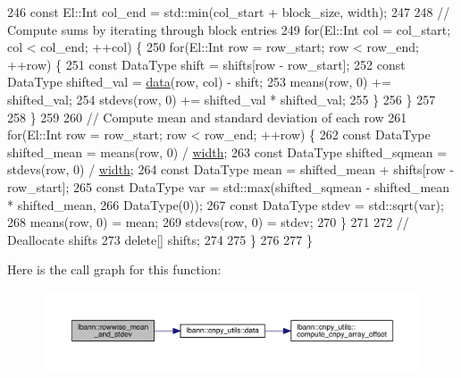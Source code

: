 \begin{DoxyCode}
246       \textcolor{keyword}{const} El::Int col\_end = std::min(col\_start + block\_size, width);
247 
248       \textcolor{comment}{// Compute sums by iterating through block entries}
249       \textcolor{keywordflow}{for}(El::Int col = col\_start; col < col\_end; ++col) \{
250         \textcolor{keywordflow}{for}(El::Int row = row\_start; row < row\_end; ++row) \{
251           \textcolor{keyword}{const} DataType shift = shifts[row - row\_start];
252           \textcolor{keyword}{const} DataType shifted\_val = \hyperlink{namespacelbann_1_1cnpy__utils_a9ac86d96ccb1f8b4b2ea16441738781f}{data}(row, col) - shift;
253           means(row, 0) += shifted\_val;
254           stdevs(row, 0) += shifted\_val * shifted\_val;
255         \}
256       \}
257 
258     \}
259 
260     \textcolor{comment}{// Compute mean and standard deviation of each row}
261     \textcolor{keywordflow}{for}(El::Int row = row\_start; row < row\_end; ++row) \{
262       \textcolor{keyword}{const} DataType shifted\_mean = means(row, 0) / \hyperlink{structlayer__header_af1f45c9c74db048ea424114418f22d50}{width};
263       \textcolor{keyword}{const} DataType shifted\_sqmean = stdevs(row, 0) / \hyperlink{structlayer__header_af1f45c9c74db048ea424114418f22d50}{width};
264       \textcolor{keyword}{const} DataType mean = shifted\_mean + shifts[row - row\_start];
265       \textcolor{keyword}{const} DataType var = std::max(shifted\_sqmean - shifted\_mean * shifted\_mean,
266                                     DataType(0));
267       \textcolor{keyword}{const} DataType stdev = std::sqrt(var);
268       means(row, 0) = mean;
269       stdevs(row, 0) = stdev;
270     \}
271 
272     \textcolor{comment}{// Deallocate shifts}
273     \textcolor{keyword}{delete}[] shifts;
274 
275   \}
276 
277 \}
\end{DoxyCode}
Here is the call graph for this function\+:\nopagebreak
\begin{figure}[H]
\begin{center}
\leavevmode
\includegraphics[width=350pt]{namespacelbann_a0c713b77f8e191addc1e0210037f9e5f_cgraph}
\end{center}
\end{figure}
\mbox{\label{namespacelbann_a9b1fd2f864f421aa0bd9f8582ad87c14}} 
